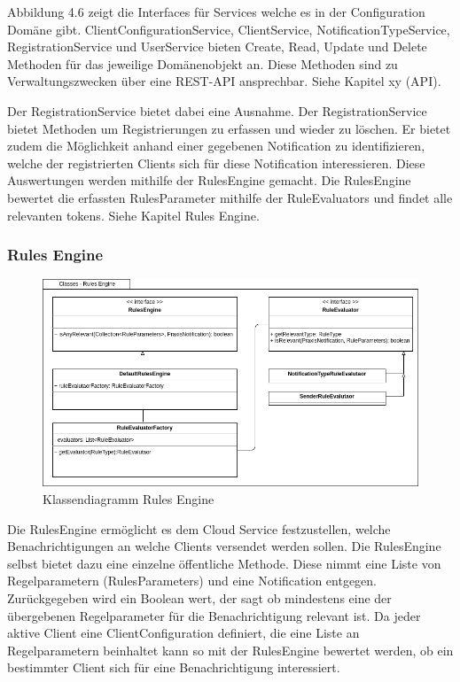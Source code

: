 Abbildung 4.6 zeigt die Interfaces für Services welche es in der Configuration Domäne gibt.
ClientConfigurationService, ClientService, NotificationTypeService, RegistrationService und UserService bieten Create, Read, Update und Delete Methoden für das jeweilige Domänenobjekt an.
Diese Methoden sind zu Verwaltungszwecken über eine REST-API ansprechbar. Siehe Kapitel xy (API).

Der RegistrationService bietet dabei eine Ausnahme.
Der RegistrationService bietet Methoden um Registrierungen zu erfassen und wieder zu löschen.
Er bietet zudem die Möglichkeit anhand einer gegebenen Notification zu identifizieren, welche der registrierten Clients sich für diese Notification interessieren.
Diese Auswertungen werden mithilfe der RulesEngine gemacht.
Die RulesEngine bewertet die erfassten RulesParameter mithilfe der RuleEvaluators und findet alle relevanten tokens. Siehe Kapitel Rules Engine.

\clearpage
\subsubsection*{Rules Engine}


\begin{figure}[h]
    \centering
    \begin{minipage}[b]{0.9\textwidth}
        \includegraphics[width=\textwidth]{graphics/Class_Configuration_RulesEngine}
        \caption{Klassendiagramm Rules Engine}
    \end{minipage}
\end{figure}

Die RulesEngine ermöglicht es dem Cloud Service festzustellen, welche Benachrichtigungen an welche Clients versendet werden sollen.
Die RulesEngine selbst bietet dazu eine einzelne öffentliche Methode.
Diese nimmt eine Liste von Regelparametern (RulesParameters) und eine Notification entgegen.
Zurückgegeben wird ein Boolean wert, der sagt ob mindestens eine der übergebenen Regelparameter für die Benachrichtigung relevant ist.
Da jeder aktive Client eine ClientConfiguration definiert, die eine Liste an Regelparametern beinhaltet kann so mit der RulesEngine bewertet werden, ob ein bestimmter Client sich für eine Benachrichtigung interessiert.

